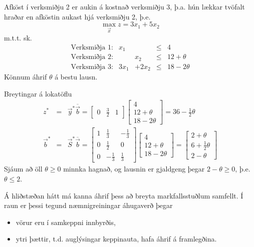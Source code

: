 \begin{daemi} Afköst í verksmiðju 2 er aukin á kostnað verksmiðju 3, þ.a. hún lækkar tvöfalt hraðar en afköstin aukast hjá verksmiðju 2, þ.e.
$$ \max_{\vec{x}} z=3x_1+5x_2$$
m.t.t. sk.
\[\begin{array}{lrrcl}
\mbox{Verksmiðja 1:} & x_1 & &\leq& 4\\
\mbox{Verksmiðja 2:} & & x_2 &\leq& 12+\theta \\
\mbox{Verksmiðja 3:} & 3x_1& +2x_2&\leq& 18-2\theta
\end{array}\]
Könnum áhrif $\theta$ á bestu lausn.
\end{daemi}
\begin{lausn}Breytingar á lokatöflu
\begin{eqnarray*}
 z^*&=&\vec{y}^*\overline{\vec{b}}=\begin{bmatrix}0&\frac{3}{2}&1\end{bmatrix}\begin{bmatrix}4\\12+\theta\\18-2\theta\end{bmatrix}=36-\frac{1}{2}\theta\\
\vec{b}^*&=&\vec{S}^*\overline{\vec{b}}=\begin{bmatrix}1&\frac{1}{3}&-\frac{1}{3}\\0&\frac{1}{2}&0\\0&-\frac{1}{3}&\frac{1}{3}\end{bmatrix}\begin{bmatrix}4\\12+\theta\\18-2\theta\end{bmatrix}=\begin{bmatrix}2+\theta\\6+\frac{1}{2}\theta\\2-\theta\end{bmatrix}
\end{eqnarray*}
Sjáum að öll $\theta\geq0$ minnka hagnað, og lausnin er gjaldgeng þegar $2-\theta\geq0$, þ.e. $\theta \leq 2$.
\end{lausn}
Á hliðstæðan hátt má kanna áhrif þess að breyta markfallsstuðlum samfellt. Í raun er þessi tegund næmnigreiningar áhugaverð þegar
\begin{itemize}
 \item vörur eru í samkeppni innbyrðis,
 \item ytri þættir, t.d. auglýsingar keppinauta, hafa áhrif á framlegðina.
\end{itemize}
